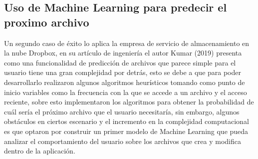 \documentclass[9pt,a4paper,twoside]{rho-class/rho}
\begin{document}
        \subsection{Uso de Machine Learning para predecir el proximo archivo}
        Un segundo caso de éxito lo aplica la empresa de servicio de almacenamiento en la nube Dropbox, en su artículo de ingeniería el autor Kumar (2019) presenta como una funcionalidad de predicción de archivos que parece simple para el usuario tiene una gran complejidad por detrás, esto se debe a que para poder desarrollarlo realizaron algunos algoritmos heurísticos tomando como punto de inicio variables como la frecuencia con la que se accede a un archivo y el acceso reciente, sobre esto implementaron los algoritmos para obtener la probabilidad de cuál sería el próximo archivo que el usuario necesitaría, sin embargo, algunos obstáculos en ciertos escenario y el incremento en la complejidad computacional es que optaron por construir un primer modelo de Machine Learning que pueda analizar el comportamiento del usuario sobre los archivos que crea y modifica dentro de la aplicación.

\end{document}
